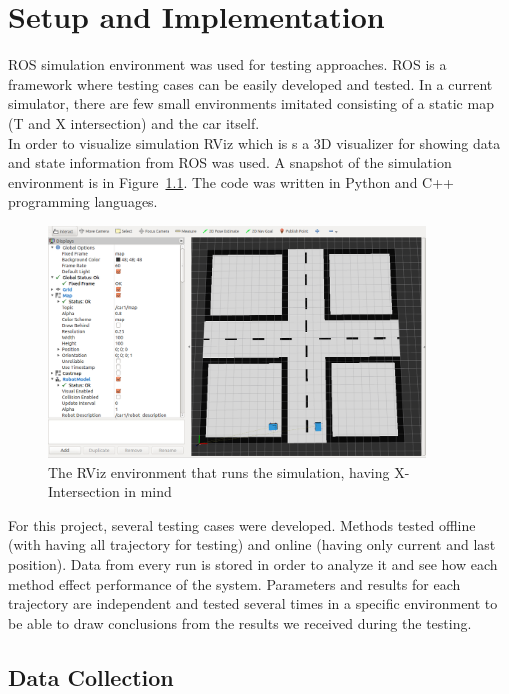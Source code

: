 \chapter{Setup and Implementation}
\label{chap:3}
%
\gls{ROS} simulation environment was used for testing approaches. \gls{ROS} is a framework where testing cases can be easily developed and tested. In a current simulator, there are few small environments imitated consisting of a static map (T and X intersection) and the car itself. \\
In order to visualize simulation \gls{RViz} which is s a 3D visualizer for showing data and state information from \gls{ROS} was used. A snapshot of the simulation environment is in Figure~\ref{fig:ROS1}. The code was written in Python and C++ programming languages.

\begin{figure}[h]
	\centering  	
	\includegraphics[width=10cm]{img/Ros.jpg}
	\caption{The \gls{RViz} environment that runs the simulation, having X-Intersection in mind}
	\label{fig:ROS1}    
\end{figure}

For this project, several testing cases were developed. Methods tested offline (with having all trajectory for testing) and online (having only current and last position). Data from every run is stored in order to analyze it and see how each method effect performance of the system.
Parameters and results for each trajectory are independent and tested several times in a specific environment to be able to draw conclusions from the results we received during the testing.

\section{Data Collection}

